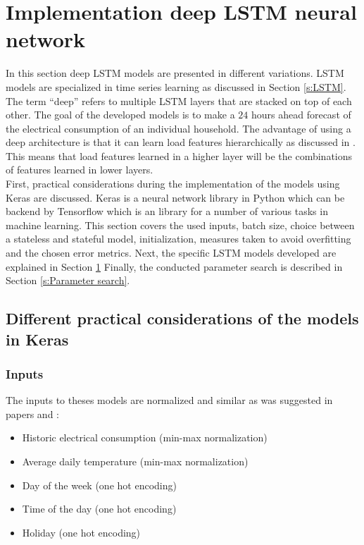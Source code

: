 \section{Implementation deep LSTM neural network}\label{s:Implementation deep LSTM neural network}
In this section deep LSTM models are presented in different variations. LSTM models are specialized in time series learning as discussed in Section \ref{s:LSTM}. The term ``deep'' refers to multiple LSTM layers that are stacked on top of each other. The goal of the developed models is to make a $ 24 $ hours ahead forecast of the electrical consumption of an individual household. The advantage of using a deep architecture is that it can learn load features hierarchically as discussed in \cite{Shi2018}. This means that load features learned in a higher layer will be the combinations of features learned in lower layers.\\
First, practical considerations during the implementation of the models using Keras are discussed. Keras is a neural network library in Python which can be backend by Tensorflow which is an library for a number of various tasks in machine learning. This section covers the used inputs, batch size, choice between a stateless and stateful model, initialization, measures taken to avoid overfitting and the chosen error metrics. Next, the specific LSTM models developed are explained in Section \ref{s:Implementation deep LSTM neural network} Finally, the conducted parameter search is described in Section \ref{s:Parameter search}.

\subsection{Different practical considerations of the models in Keras}

\subsubsection{Inputs}\label{s:Inputs}
The inputs to theses models are normalized and similar as was suggested in papers \cite{loadforecastingmoor} and \cite{Kong2019}: 

\begin{itemize}
	\item Historic electrical consumption (min-max normalization)
	\item Average daily temperature (min-max normalization)
	\item Day of the week (one hot encoding)
	\item Time of the day (one hot encoding)
	\item Holiday (one hot encoding)
\end{itemize}

